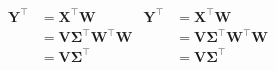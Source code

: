 \documentclass[10pt]{book}
\begin{document}
\begin{mdSnippets}
\begin{mdDisplaySnippet}%
\[%
{\displaystyle {\begin{aligned}\mathbf {Y} ^{\top }&=\mathbf {X} ^{\top }\mathbf {W} \\&=\mathbf {V} \mathbf {\Sigma } ^{\top }\mathbf {W} ^{\top }\mathbf {W} \\&=\mathbf {V} \mathbf {\Sigma } ^{\top }\end{aligned}}} 
\begin{align}
\mathbf{Y}^\top & = \mathbf{X}^\top\mathbf{W} \\
& = \mathbf{V}\mathbf{\Sigma}^\top\mathbf{W}^\top\mathbf{W} \\
& = \mathbf{V}\mathbf{\Sigma}^\top
\end{align}
\]%
\end{mdDisplaySnippet}%

\end{mdSnippets}
\end{document}
